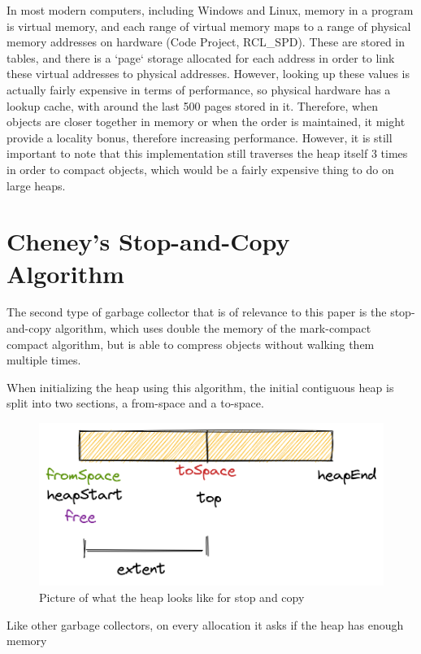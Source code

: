 \documentclass[index]{subfiles}
\begin{document}
In most modern computers, including Windows and Linux, memory in a program is virtual memory, and each range of virtual memory maps to a range of physical memory addresses on hardware (Code Project, RCL\_SPD). These are stored in tables, and there is a  `page` storage allocated for each address in order to link these virtual addresses to physical addresses. However, looking up these values is actually fairly expensive in terms of performance, so physical hardware has a lookup cache, with around the last 500 pages stored in it. Therefore, when objects are closer together in memory or when the order is maintained, it might provide a locality bonus, therefore increasing performance. However, it is still important to note that this implementation still traverses the heap itself 3 times in order to compact objects, which would be a fairly expensive thing to do on large heaps.

\section{Cheney's Stop-and-Copy Algorithm}

The second type of garbage collector that is of relevance to this paper is the stop-and-copy algorithm, which uses double the memory of the mark-compact compact algorithm, but is able to compress objects without walking them multiple times.

When initializing the heap using this algorithm,  the initial contiguous heap is split into two sections, a from-space and a to-space.

\begin{figure}[H]
    \centering
    \includegraphics[scale=0.3]{pics/split-heap-diagram.png}
    \caption{Picture of what the heap looks like for stop and copy}
\end{figure}

Like other garbage collectors, on every allocation it asks if the heap has enough memory
\end{document}
